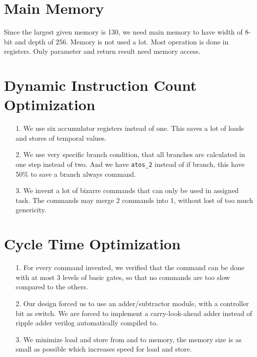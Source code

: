 \documentclass{article}
\begin{document}
  \section{Main Memory}
    \qquad Since the largest given memory is 130, we need main memory to have width of 8-bit and depth of 256.
    Memory is not used a lot. Most operation is done in registers. Only parameter and return result need memory access.
  \section{Dynamic Instruction Count Optimization}
    \begin{itemize}
      \item[1. ] We use six accumulator registers instead of one. This saves a lot of loads and stores of temporal values.
      \item[2. ] We use very specific branch condition, that all branches are calculated in one step instead of two. And we have
        \texttt{atos\_2} instead of if branch, this have 50\% to save a branch always command.
      \item[3. ] We invent a lot of bizarre commands that can only be used in assigned task. The commands may merge 2 commands
        into 1, without lost of too much genericity.
    \end{itemize}
  \section{Cycle Time Optimization}
    \begin{itemize}
      \item[1. ] For every command invented, we verified that the command can be done with at most 3 levels of basic gates, so that no commands are
      too slow compared to the others.
      \item[2. ] Our design forced us to use an adder/subtractor module, with a controller bit as switch. We are forced to implement a
      carry-look-ahead adder instead of ripple adder verilog automatically compiled to.
      \item[3. ] We minimize load and store from and to memory, the memory size is as small as possible which increases speed for load
      and store.
    \end{itemize}
\end{document}
